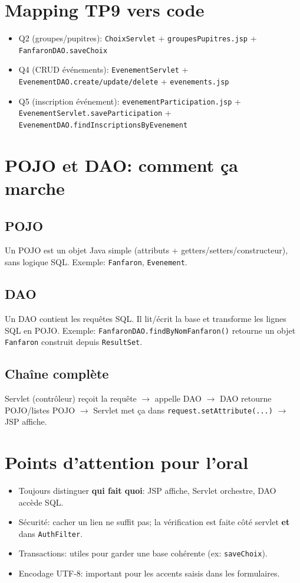 ﻿\documentclass[11pt,a4paper]{article}
\begin{document}
\section{Mapping TP9 vers code}
\begin{itemize}
  \item Q2 (groupes/pupitres): \texttt{ChoixServlet} + \texttt{groupesPupitres.jsp} + \texttt{FanfaronDAO.saveChoix}
  \item Q4 (CRUD événements): \texttt{EvenementServlet} + \texttt{EvenementDAO.create/update/delete} + \texttt{evenements.jsp}
  \item Q5 (inscription événement): \texttt{evenementParticipation.jsp} + \texttt{EvenementServlet.saveParticipation} + \texttt{EvenementDAO.findInscriptionsByEvenement}
\end{itemize}

\section{POJO et DAO: comment ça marche}
\subsection*{POJO}
Un POJO est un objet Java simple (attributs + getters/setters/constructeur), sans logique SQL.
Exemple: \texttt{Fanfaron}, \texttt{Evenement}.

\subsection*{DAO}
Un DAO contient les requêtes SQL. Il lit/écrit la base et transforme les lignes SQL en POJO.
Exemple: \texttt{FanfaronDAO.findByNomFanfaron()} retourne un objet \texttt{Fanfaron} construit depuis \texttt{ResultSet}.

\subsection*{Chaîne complète}
Servlet (contrôleur) reçoit la requête $\rightarrow$ appelle DAO $\rightarrow$ DAO retourne POJO/listes POJO $\rightarrow$ Servlet met ça dans \texttt{request.setAttribute(...)} $\rightarrow$ JSP affiche.

\section{Points d'attention pour l'oral}
\begin{itemize}
  \item Toujours distinguer \textbf{qui fait quoi}: JSP affiche, Servlet orchestre, DAO accède SQL.
  \item Sécurité: cacher un lien ne suffit pas; la vérification est faite côté servlet \textbf{et} dans \texttt{AuthFilter}.
  \item Transactions: utiles pour garder une base cohérente (ex: \texttt{saveChoix}).
  \item Encodage UTF-8: important pour les accents saisis dans les formulaires.
\end{itemize}
\end{document}
